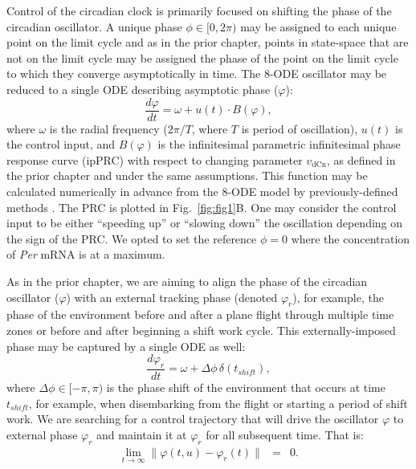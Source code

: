 Control of the circadian clock is primarily focused on shifting the phase of the circadian oscillator.
A unique phase $\phi \in[0,2\pi)$ may be assigned to each unique point on the limit cycle and as in the prior chapter, points in state-space that are not on the limit cycle may be assigned the phase of the point on the limit cycle to which they converge asymptotically in time. 
The 8-ODE oscillator may be reduced to a single ODE describing asymptotic phase ($\varphi$):
\begin{equation}\label{eq:cphase}
    \frac{d\varphi}{dt} = \omega + u(t)\cdot B(\varphi),
\end{equation}
where $\omega$ is the radial frequency ($2\pi/T$, where $T$ is period of oscillation), $u(t)$ is the control input, and $B(\varphi)$ is the infinitesimal parametric infinitesimal phase response curve (ipPRC) with respect to changing parameter $v_\text{dCn}$, as defined in the prior chapter and under the same assumptions.
This function may be calculated numerically in advance from the 8-ODE model by previously-defined methods \cite{Taylor2008,Abel2016b}.
The PRC is plotted in Fig.~\ref{fig:fig1}B.
One may consider the control input to be either ``speeding up'' or ``slowing down'' the oscillation depending on the sign of the PRC.
We opted to set the reference $\phi=0$ where the concentration of \textit{Per} mRNA is at a maximum.

As in the prior chapter, we are aiming to align the phase of the circadian oscillator ($\varphi$) with an external tracking phase (denoted $\varphi_r$), for example, the phase of the environment before and after a plane flight through multiple time zones or before and after beginning a shift work cycle.
This externally-imposed phase may be captured by a single ODE as well:
\begin{equation}\label{eq:ephase}
    \frac{d\varphi_r}{dt} = \omega +\Delta\phi\,\delta(t_{shift}),
\end{equation}
where $\Delta\phi \in [-\pi,\pi)$ is the phase shift of the environment that occurs at time $t_{shift}$, for example, when disembarking from the flight or starting a period of shift work.
We are searching for a control trajectory that will drive the oscillator $\varphi$ to external phase $\varphi_r$ and maintain it at $\varphi_r$ for all subsequent time. That is:
\begin{eqnarray*}
\lim_{t\to\infty} \|\varphi(t,u) - \varphi_r(t)\|&=&0.
\end{eqnarray*}


